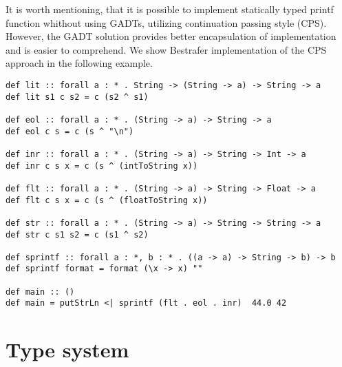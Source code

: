\documentclass[declaration,shortabstract,english]{iithesis}
\begin{document}
It is worth mentioning, that it is possible to implement statically typed printf function
whithout using GADTs, utilizing continuation passing style (CPS)\cite{unparsing}.
However, the GADT solution provides better encapsulation of implementation and
is easier to comprehend. We show Bestrafer implementation of the CPS approach in the following example.
\begin{verbatim}
def lit :: forall a : * . String -> (String -> a) -> String -> a
def lit s1 c s2 = c (s2 ^ s1)

def eol :: forall a : * . (String -> a) -> String -> a
def eol c s = c (s ^ "\n")

def inr :: forall a : * . (String -> a) -> String -> Int -> a
def inr c s x = c (s ^ (intToString x))

def flt :: forall a : * . (String -> a) -> String -> Float -> a
def flt c s x = c (s ^ (floatToString x))

def str :: forall a : * . (String -> a) -> String -> String -> a
def str c s1 s2 = c (s1 ^ s2)

def sprintf :: forall a : *, b : * . ((a -> a) -> String -> b) -> b
def sprintf format = format (\x -> x) ""

def main :: ()
def main = putStrLn <| sprintf (flt . eol . inr)  44.0 42
\end{verbatim}

\chapter{Type system}
\end{document}
